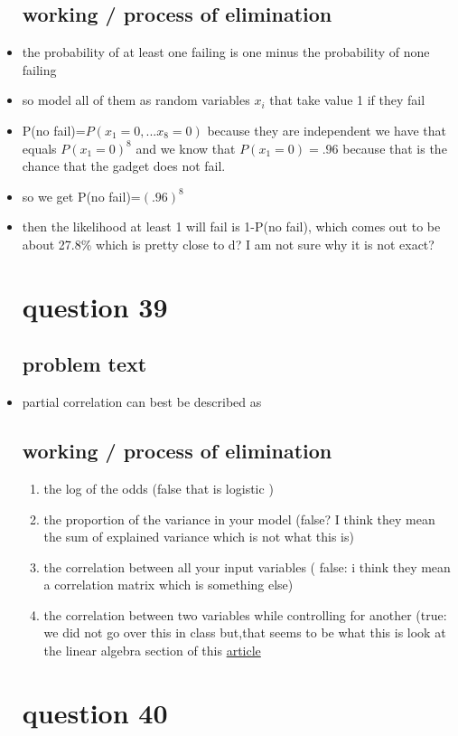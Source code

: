 \documentclass{article}
\begin{document}
\begin{itemize}
\subsection{working / process of elimination }
\item the probability of at least one failing is one minus the probability of none failing 
\item so model all of them as random variables $x_i$ that take value 1 if they fail 
\item P(no fail)=$P(x_1=0,...x_8=0)$ because they are independent we have that equals $P(x_1=0)^8$ and we know that $P(x_1=0)=.96$ because that is the chance that the gadget does not fail. 
\item so we get P(no fail)=$(.96)^8$
\item then the likelihood at least 1 will fail is 1-P(no fail), which comes out to be about 27.8\% which is pretty close to  d? I am not sure why it is not exact? 



\section{question 39}
\subsection{problem text}
\item partial correlation can best be described as 
\subsection{working / process of elimination }
\begin{enumerate}
    \item the log of the odds (false that is logistic )
    \item the proportion of the variance in your model (false? I think they mean the sum of explained variance which is not what this is)
    \item the correlation between all your input variables ( false: i think they mean a correlation matrix which is something else)
    \item the correlation between two variables while controlling for another (true: we did not go over this in class but,that seems to be what this  is look at the linear algebra section of this \href{https://en.wikipedia.org/wiki/Partial_correlation}{article}
\end{enumerate}
\section{question 40}

\end{itemize}
\end{document}
